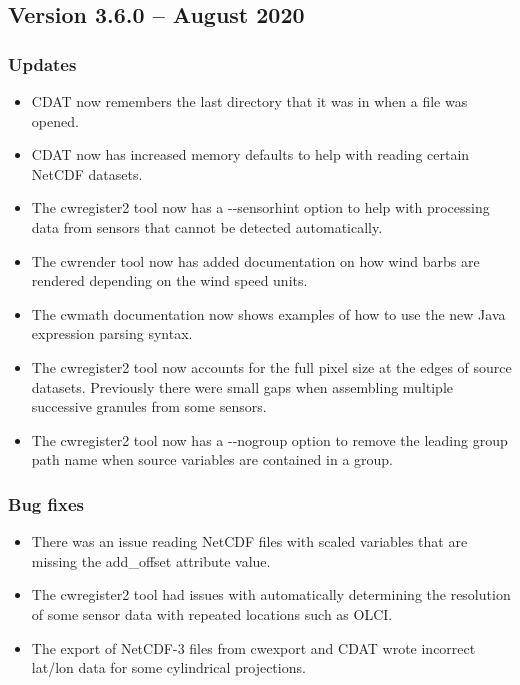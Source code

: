 
\subsection*{Version 3.6.0 -- August 2020}

\subsubsection*{ Updates}

\begin{itemize}

  \item CDAT now remembers the last directory that it was in when a file
  was opened.
  
  \item CDAT now has increased memory defaults to help with reading
  certain NetCDF datasets.
  
  \item The cwregister2 tool now has a -{-}sensorhint option to help with
  processing data from sensors that cannot be detected automatically.
  
  \item The cwrender tool now has added documentation on how wind barbs
  are rendered depending on the wind speed units.
  
  \item The cwmath documentation now shows examples of how to use the new
  Java expression parsing syntax.
    
  \item The cwregister2 tool now accounts for the full pixel size at the edges
  of source datasets.  Previously there were small gaps when assembling
  multiple successive granules from some sensors.
  
  \item The cwregister2 tool now has a -{-}nogroup option to remove
  the leading group path name when source variables are contained in a group.

\end{itemize}

\subsubsection*{ Bug fixes}
\begin{itemize}

  \item There was an issue reading NetCDF files with scaled variables that are
  missing the add\_offset attribute value.

  \item The cwregister2 tool had issues with automatically determining the
  resolution of some sensor data with repeated locations such as OLCI.
  
  \item The export of NetCDF-3 files from cwexport and CDAT wrote incorrect
  lat/lon data for some cylindrical projections.

\end{itemize}

